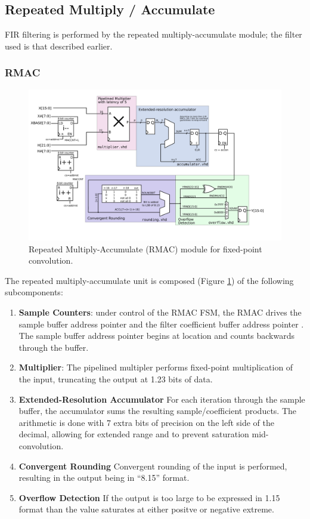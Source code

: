\subsection{Repeated Multiply / Accumulate } 
FIR filtering is performed by the repeated multiply-accumulate module; the filter used is that described earlier. 

\subsubsection{RMAC}
\begin{figure}
\label{rmac}
\includegraphics[scale=0.7]{RMAC.svg}
\caption{Repeated Multiply-Accumulate (RMAC) module for fixed-point convolution.}
\end{figure} 
The repeated multiply-accumulate unit is composed (Figure \ref{rmac}) of the following subcomponents:

\begin{enumerate}
\item \textbf{Sample Counters}: under control of the RMAC FSM, the RMAC drives the sample buffer address pointer  and the filter coefficient buffer address pointer . The sample buffer address pointer begins at location  and counts backwards through the buffer. 
\item \textbf{Multiplier}: The pipelined multipler performs fixed-point multiplication of the input, truncating the output at 1.23 bits of data. 
\item \textbf{Extended-Resolution Accumulator} For each iteration through the sample buffer, the accumulator sums the resulting sample/coefficient products. The arithmetic is done with 7 extra bits of precision on the left side of the decimal, allowing for extended range and to prevent saturation mid-convolution. 
\item \textbf{Convergent Rounding} Convergent rounding of the input is performed, resulting in the output being in ``8.15'' format. 
\item \textbf{Overflow Detection} If the output is too large to be expressed in 1.15 format than the value saturates at either positve or negative extreme. 
\end{enumerate}


